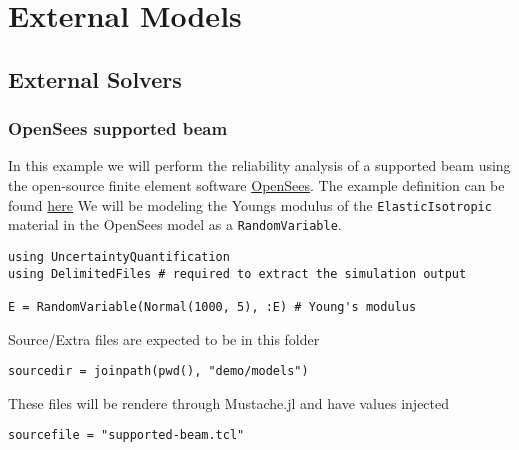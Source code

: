 \chapter{External Models}


\section{External Solvers}



\label{11735303123183305173}{}


\subsection{OpenSees supported beam}



\label{15139231179555957110}{}


In this example we will perform the reliability analysis of a supported beam using the open-source finite element software \href{https://opensees.berkeley.edu/}{OpenSees}. The example definition can be found \href{https://opensees.berkeley.edu/wiki/index.php/Simply\_supported\_beam\_modeled\_with\_two\_dimensional\_solid\_elements}{here} We will be modeling the Young{\textquotesingle}s modulus of the \texttt{ElasticIsotropic} material in the OpenSees model as a \texttt{RandomVariable}.




\begin{verbatim}
using UncertaintyQuantification
using DelimitedFiles # required to extract the simulation output

E = RandomVariable(Normal(1000, 5), :E) # Young's modulus
\end{verbatim}



Source/Extra files are expected to be in this folder




\begin{verbatim}
sourcedir = joinpath(pwd(), "demo/models")
\end{verbatim}



These files will be rendere through Mustache.jl and have values injected




\begin{verbatim}
sourcefile = "supported-beam.tcl"
\end{verbatim}




